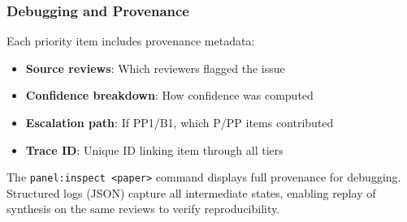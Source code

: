 \subsubsection{Debugging and Provenance}

Each priority item includes provenance metadata:
\begin{itemize}
\item \textbf{Source reviews}: Which reviewers flagged the issue
\item \textbf{Confidence breakdown}: How confidence was computed
\item \textbf{Escalation path}: If PP1/B1, which P/PP items contributed
\item \textbf{Trace ID}: Unique ID linking item through all tiers
\end{itemize}

The \texttt{panel:inspect <paper>} command displays full provenance for debugging. Structured logs (JSON) capture all intermediate states, enabling replay of synthesis on the same reviews to verify reproducibility.
